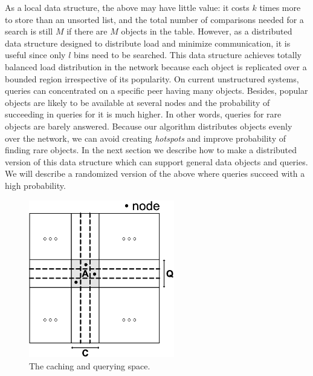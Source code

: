\documentclass[conference]{IEEEtran}
\begin{document}
As a local data structure, the above may have little value: it costs $k$ times
more to store than an unsorted list, and the total number of comparisons
needed for a search is still $M$ if there are $M$ objects in the table.
However, as a distributed data structure designed to distribute load and
minimize communication, it is useful since only $l$ bins need to be searched.
This data structure achieves totally balanced load distribution 
in the network because each object is replicated over a bounded region 
irrespective of its popularity. On current unstructured systems, queries 
can concentrated on a specific peer having many objects. Besides, popular objects 
are likely to be available at several nodes and the probability of succeeding in
queries for it is much higher. In other words, queries for rare
objects are barely 
answered. Because our algorithm distributes objects 
evenly over the network, we can avoid creating \emph{hotspots} and improve 
probability of finding rare objects.
In the next section we describe how to
make a distributed version of this data structure which can support general
data objects and queries.  We will describe a randomized version of the above
where queries succeed with a high probability.
\begin{figure}
\centering
\includegraphics[width=2.5in]{space}
\caption{The caching and querying space.} \label{fig:space}
\end{figure}
\end{document}
